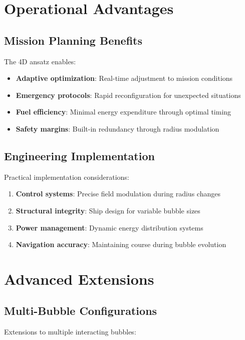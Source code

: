 \documentclass[12pt,a4paper]{article}
\begin{document}
\section{Operational Advantages}

\subsection{Mission Planning Benefits}

The 4D ansatz enables:

\begin{itemize}
\item \textbf{Adaptive optimization}: Real-time adjustment to mission conditions
\item \textbf{Emergency protocols}: Rapid reconfiguration for unexpected situations
\item \textbf{Fuel efficiency}: Minimal energy expenditure through optimal timing
\item \textbf{Safety margins}: Built-in redundancy through radius modulation
\end{itemize}

\subsection{Engineering Implementation}

Practical implementation considerations:

\begin{enumerate}
\item \textbf{Control systems}: Precise field modulation during radius changes
\item \textbf{Structural integrity}: Ship design for variable bubble sizes
\item \textbf{Power management}: Dynamic energy distribution systems
\item \textbf{Navigation accuracy}: Maintaining course during bubble evolution
\end{enumerate}

\section{Advanced Extensions}

\subsection{Multi-Bubble Configurations}

Extensions to multiple interacting bubbles:
\end{document}
